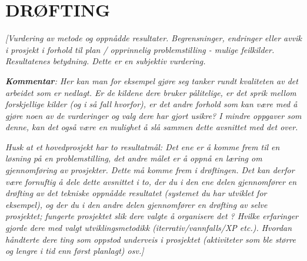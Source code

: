 \documentclass[../main.tex]{subfiles}
\begin{document}
\section{DR{\O}FTING}

\bigskip

{\itshape\color{blue}
[Vurdering av metode og oppn{\aa}dde resultater. Begrensninger, endringer eller avvik i prosjekt i forhold til plan /
opprinnelig problemstilling - mulige feilkilder. Resultatenes betydning. Dette er en subjektiv vurdering.}

{\itshape\color{blue}
\textbf{\textup{Kommentar}}: Her kan man for eksempel gj{\o}re seg tanker rundt kvaliteten av det arbeidet som er
nedlagt. Er de kildene dere bruker p{\aa}litelige, er det sprik mellom forskjellige kilder (og i s{\aa} fall hvorfor),
er det andre forhold som kan v{\ae}re med {\aa} gj{\o}re noen av de vurderinger og valg dere har gjort usikre? I mindre
oppgaver som denne, kan det ogs{\aa} v{\ae}re en mulighet {\aa} sl{\aa} sammen dette avsnittet med det over.}

{\itshape\color{blue}
Husk at et hovedprosjekt har to resultatm{\aa}l: Det ene er {\aa} komme frem til en l{\o}sning p{\aa} en
problemstilling, det andre m{\aa}let er {\aa} oppn{\aa} en l{\ae}ring om gjennomf{\o}ring av prosjekter. Dette m{\aa}
komme frem i dr{\o}ftingen. Det kan derfor v{\ae}re fornuftig {\aa} dele dette avsnittet i to, der du i den ene delen
gjennomf{\o}rer en dr{\o}fting av det tekniske oppn{\aa}dde resultatet (systemet du har utviklet for eksempel), og der
du i den andre delen gjennomf{\o}rer en dr{\o}fting av selve prosjektet; fungerte prosjektet slik dere valgte {\aa}
organisere det ? Hvilke erfaringer gjorde dere med valgt utviklingsmetodikk (iterrativ/vannfalls/XP etc.). Hvordan
h{\aa}ndterte dere ting som oppstod underveis i prosjektet (aktiviteter som ble st{\o}rre og lengre i tid enn f{\o}rst
planlagt) osv.]}
\end{document}
